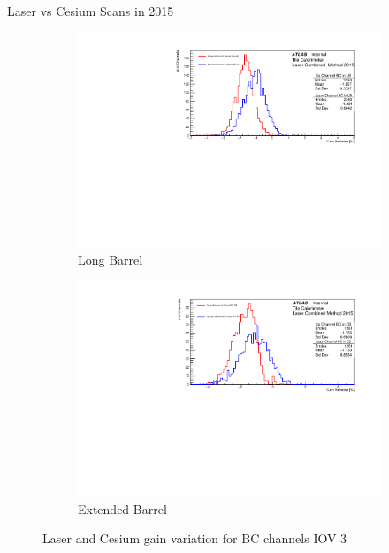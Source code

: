 \documentclass{beamer}
\begin{document}
\begin{frame}{Laser vs Cesium Scans in 2015}
\begin{figure}[H]
\centering
\begin{subfigure} [t] {0.49\textwidth}
\includegraphics[width=\textwidth]{cs1d_bc_lb_iov3.pdf}
\caption{Long Barrel}
\end{subfigure}
\begin{subfigure} [t] {0.49\textwidth}
\includegraphics[width=\textwidth]{cs1d_bc_eb_iov3.pdf}
\caption{Extended Barrel}
\end{subfigure}
\caption{Laser and Cesium gain variation for BC channels IOV 3}
\end{figure}
\end{frame}
\end{document}
